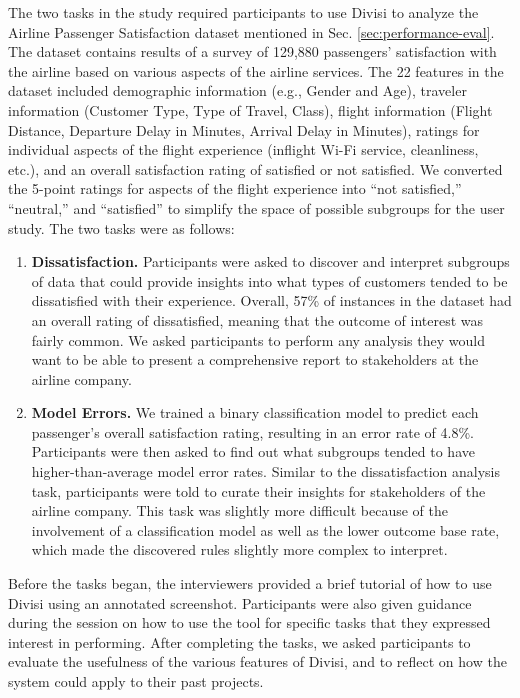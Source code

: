 The two tasks in the study required participants to use Divisi to analyze the Airline Passenger Satisfaction dataset mentioned in Sec. \ref{sec:performance-eval}. 
The dataset contains results of a survey of 129,880 passengers’ satisfaction with the airline based on various aspects of the airline services. 
The 22 features in the dataset included demographic information (e.g., Gender and Age), traveler information (Customer Type, Type of Travel, Class), flight information (Flight Distance, Departure Delay in Minutes, Arrival Delay in Minutes), ratings for individual aspects of the flight experience (inflight Wi-Fi service, cleanliness, etc.), and an overall satisfaction rating of satisfied or not satisfied. We converted the 5-point ratings for aspects of the flight experience into ``not satisfied,'' ``neutral,'' and ``satisfied'' to simplify the space of possible subgroups for the user study.
The two tasks were as follows:
\begin{enumerate}[label={\bfseries Study Task \arabic*:}, ref={Study Task \arabic*},itemsep=1ex,labelindent=0pt, wide=0pt]
    \item \textbf{Dissatisfaction.} Participants were asked to discover and interpret subgroups of data that could provide insights into what types of customers tended to be dissatisfied with their experience. Overall, 57\% of instances in the dataset had an overall rating of dissatisfied, meaning that the outcome of interest was fairly common. We asked participants to perform any analysis they would want to be able to present a comprehensive report to stakeholders at the airline company.
    \label{study-task:dissatisfaction}

    \item \textbf{Model Errors.} We trained a binary classification model to predict each passenger's overall satisfaction rating, resulting in an error rate of 4.8\%. Participants were then asked to find out what subgroups tended to have higher-than-average model error rates. Similar to the dissatisfaction analysis task, participants were told to curate their insights for stakeholders of the airline company. This task was slightly more difficult because of the involvement of a classification model as well as the lower outcome base rate, which made the discovered rules slightly more complex to interpret. \label{study-task:error}
\end{enumerate}
Before the tasks began, the interviewers provided a brief tutorial of how to use Divisi using an annotated screenshot. Participants were also given guidance during the session on how to use the tool for specific tasks that they expressed interest in performing.
After completing the tasks, we asked participants to evaluate the usefulness of the various features of Divisi, and to reflect on how the system could apply to their past projects. 

